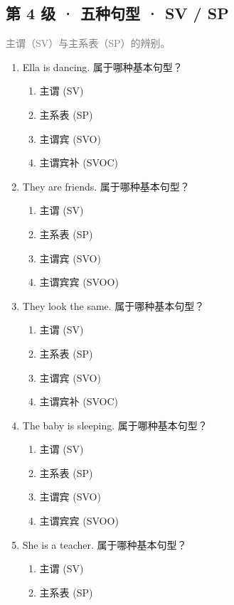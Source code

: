 \documentclass[11pt,a4paper]{ctexart}
\begin{document}
\subsection*{第 4 级 · 五种句型 · SV / SP}
\noindent\textcolor{gray}{主谓（SV）与主系表（SP）的辨别。}\par\smallskip
\begin{enumerate}[leftmargin=*,itemsep=4pt]
\item Ella is dancing. 属于哪种基本句型？
\begin{enumerate}[label=\Alph*.,leftmargin=2em,itemsep=1pt,topsep=2pt]
\item 主谓 (SV)
\item 主系表 (SP)
\item 主谓宾 (SVO)
\item 主谓宾补 (SVOC)
\end{enumerate}
\item They are friends. 属于哪种基本句型？
\begin{enumerate}[label=\Alph*.,leftmargin=2em,itemsep=1pt,topsep=2pt]
\item 主谓 (SV)
\item 主系表 (SP)
\item 主谓宾 (SVO)
\item 主谓宾宾 (SVOO)
\end{enumerate}
\item They look the same. 属于哪种基本句型？
\begin{enumerate}[label=\Alph*.,leftmargin=2em,itemsep=1pt,topsep=2pt]
\item 主谓 (SV)
\item 主系表 (SP)
\item 主谓宾 (SVO)
\item 主谓宾补 (SVOC)
\end{enumerate}
\item The baby is sleeping. 属于哪种基本句型？
\begin{enumerate}[label=\Alph*.,leftmargin=2em,itemsep=1pt,topsep=2pt]
\item 主谓 (SV)
\item 主系表 (SP)
\item 主谓宾 (SVO)
\item 主谓宾宾 (SVOO)
\end{enumerate}
\item She is a teacher. 属于哪种基本句型？
\begin{enumerate}[label=\Alph*.,leftmargin=2em,itemsep=1pt,topsep=2pt]
\item 主谓 (SV)
\item 主系表 (SP)

\end{enumerate}
\end{enumerate}
\end{document}

